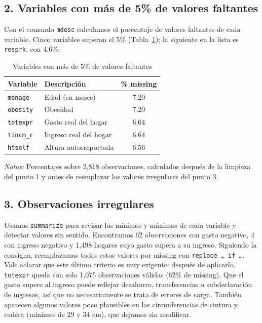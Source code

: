\documentclass[11pt,a4paper]{article}
\newcommand{\notas}[1]{\par\vspace{0.3em}\begin{minipage}{0.92\linewidth}\footnotesize\textit{Notas:} #1\end{minipage}}
\begin{document}
\subsection*{2. Variables con más de 5\% de valores faltantes}

Con el comando \texttt{mdesc} calculamos el porcentaje de valores faltantes de cada variable. Cinco variables superan el 5\% (Tabla~\ref{tab:missing}); la siguiente en la lista es \texttt{resprk}, con 4.6\%.

\begin{table}[H]\centering
\caption{Variables con más de 5\% de valores faltantes}\label{tab:missing}
\begin{tabular}{llc}
\toprule
Variable & Descripción & \% missing \\
\midrule
\texttt{monage} & Edad (en meses) & 7.20 \\
\texttt{obesity} & Obesidad & 7.20 \\
\texttt{totexpr} & Gasto real del hogar & 6.64 \\
\texttt{tincm\_r} & Ingreso real del hogar & 6.64 \\
\texttt{htself} & Altura autorreportada & 6.56 \\
\bottomrule
\end{tabular}
\notas{Porcentajes sobre 2,818 observaciones, calculados después de la limpieza del punto 1 y antes de reemplazar los valores irregulares del punto 3.}
\end{table}

\subsection*{3. Observaciones irregulares}

Usamos \texttt{summarize} para revisar los mínimos y máximos de cada variable y detectar valores sin sentido. Encontramos 62 observaciones con gasto negativo, 4 con ingreso negativo y 1,498 hogares cuyo gasto supera a su ingreso. Siguiendo la consigna, reemplazamos todos estos valores por missing con \texttt{replace \ldots\ if \ldots}. Vale aclarar que este último criterio es muy exigente: después de aplicarlo, \texttt{totexpr} queda con solo 1,075 observaciones válidas (62\% de missing). Que el gasto supere al ingreso puede reflejar desahorro, transferencias o subdeclaración de ingresos, así que no necesariamente se trata de errores de carga. También aparecen algunos valores poco plausibles en las circunferencias de cintura y cadera (mínimos de 29 y 34 cm), que dejamos sin modificar.
\end{document}
